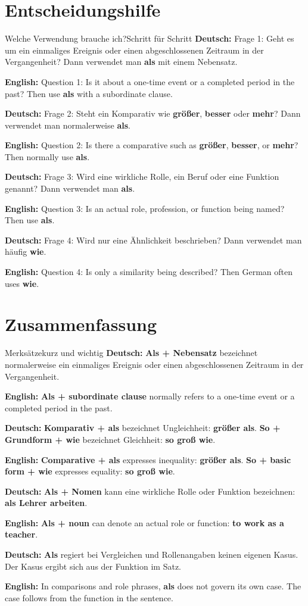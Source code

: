 \documentclass[a4paper,11pt]{article}
\newcommand{\GermanText}[1]{\textbf{Deutsch: }#1\par}
\newcommand{\EnglishText}[1]{{\small\color{SoftGray}\textbf{English: }#1\par}}
\begin{document}
    \section{Entscheidungshilfe}

        \begin{grammarentry}{Welche Verwendung brauche ich?}{Schritt für Schritt}
            \GermanText{Frage 1: Geht es um ein einmaliges Ereignis oder einen abgeschlossenen Zeitraum in der Vergangenheit? Dann verwendet man \textbf{als} mit einem Nebensatz.}
            \EnglishText{Question 1: Is it about a one-time event or a completed period in the past? Then use \textbf{als} with a subordinate clause.}

            \GermanText{Frage 2: Steht ein Komparativ wie \textbf{größer}, \textbf{besser} oder \textbf{mehr}? Dann verwendet man normalerweise \textbf{als}.}
            \EnglishText{Question 2: Is there a comparative such as \textbf{größer}, \textbf{besser}, or \textbf{mehr}? Then normally use \textbf{als}.}

            \GermanText{Frage 3: Wird eine wirkliche Rolle, ein Beruf oder eine Funktion genannt? Dann verwendet man \textbf{als}.}
            \EnglishText{Question 3: Is an actual role, profession, or function being named? Then use \textbf{als}.}

            \GermanText{Frage 4: Wird nur eine Ähnlichkeit beschrieben? Dann verwendet man häufig \textbf{wie}.}
            \EnglishText{Question 4: Is only a similarity being described? Then German often uses \textbf{wie}.}
        \end{grammarentry}

    \section{Zusammenfassung}

        \begin{grammarentry}{Merksätze}{kurz und wichtig}
            \GermanText{\textbf{Als + Nebensatz} bezeichnet normalerweise ein einmaliges Ereignis oder einen abgeschlossenen Zeitraum in der Vergangenheit.}
            \EnglishText{\textbf{Als + subordinate clause} normally refers to a one-time event or a completed period in the past.}

            \GermanText{\textbf{Komparativ + als} bezeichnet Ungleichheit: \textbf{größer als}. \textbf{So + Grundform + wie} bezeichnet Gleichheit: \textbf{so groß wie}.}
            \EnglishText{\textbf{Comparative + als} expresses inequality: \textbf{größer als}. \textbf{So + basic form + wie} expresses equality: \textbf{so groß wie}.}

            \GermanText{\textbf{Als + Nomen} kann eine wirkliche Rolle oder Funktion bezeichnen: \textbf{als Lehrer arbeiten}.}
            \EnglishText{\textbf{Als + noun} can denote an actual role or function: \textbf{to work as a teacher}.}

            \GermanText{\textbf{Als} regiert bei Vergleichen und Rollenangaben keinen eigenen Kasus. Der Kasus ergibt sich aus der Funktion im Satz.}
            \EnglishText{In comparisons and role phrases, \textbf{als} does not govern its own case. The case follows from the function in the sentence.}
        \end{grammarentry}
\end{document}

